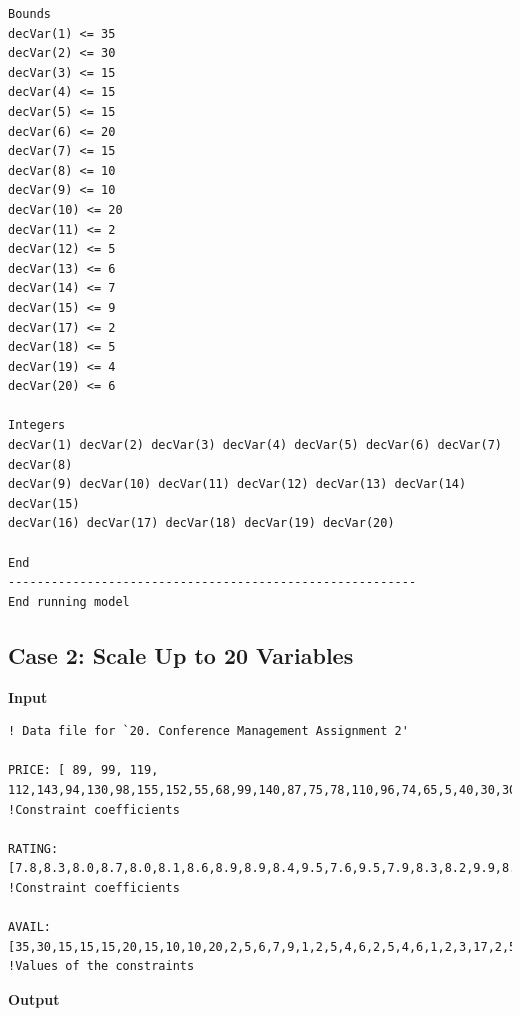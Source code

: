 \documentclass[paper=a4, fontsize=11pt]{scrartcl} %
\begin{document}
\begin{verbatim}
Bounds
decVar(1) <= 35
decVar(2) <= 30
decVar(3) <= 15
decVar(4) <= 15
decVar(5) <= 15
decVar(6) <= 20
decVar(7) <= 15
decVar(8) <= 10
decVar(9) <= 10
decVar(10) <= 20
decVar(11) <= 2
decVar(12) <= 5
decVar(13) <= 6
decVar(14) <= 7
decVar(15) <= 9
decVar(17) <= 2
decVar(18) <= 5
decVar(19) <= 4
decVar(20) <= 6

Integers
decVar(1) decVar(2) decVar(3) decVar(4) decVar(5) decVar(6) decVar(7) decVar(8) 
decVar(9) decVar(10) decVar(11) decVar(12) decVar(13) decVar(14) decVar(15) 
decVar(16) decVar(17) decVar(18) decVar(19) decVar(20) 

End
---------------------------------------------------------
End running model
\end{verbatim}



\subsection{Case 2: Scale Up to 20 Variables}
\textbf{Input}
\begin{verbatim}
! Data file for `20. Conference Management Assignment 2'

PRICE: [ 89, 99, 119, 112,143,94,130,98,155,152,55,68,99,140,87,75,78,110,96,74,65,5,40,30,30,17,15,89,10,20] !Constraint coefficients	 	

RATING: [7.8,8.3,8.0,8.7,8.0,8.1,8.6,8.9,8.9,8.4,9.5,7.6,9.5,7.9,8.3,8.2,9.9,8.8,8.0,8.9,8.1,8.3,8.2,8.5,8.9,9.5,7.8,9.1,8.1,8.2] !Constraint coefficients

AVAIL:[35,30,15,15,15,20,15,10,10,20,2,5,6,7,9,1,2,5,4,6,2,5,4,6,1,2,3,17,2,5] !Values of the constraints
\end{verbatim}
\textbf{Output}
\end{document}

